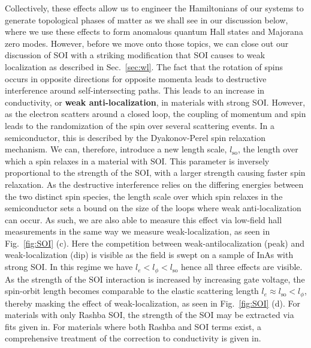 Collectively, these effects allow us to engineer the Hamiltonians of our systems to generate topological phases of matter as we shall see in our discussion below,
where we use these effects to form anomalous quantum Hall states and Majorana zero modes. However, before we move onto those topics, we can close out our discussion of SOI
with a striking modification that SOI causes to weak localization as described in Sec.~\ref{sec:wl}. The fact that the rotation of spins occurs in opposite
directions for opposite momenta leads to destructive interference around self-intersecting paths. This leads to an increase in conductivity, or \textbf{weak anti-localization},
in materials with strong SOI\cite{10.1143/PTP.63.707}. However, as the electron scatters around a closed loop, the coupling of momentum and spin leads to the randomization of
the spin over several scattering events. In a semiconductor, this is described by the Dyakonov-Perel spin relaxation
mechanism\cite{DYAKONOV1971459}. We can, therefore, introduce a new length scale, $l_\textrm{so}$, the length over which a spin relaxes in a material with SOI.
This parameter is inversely proportional to the strength of the SOI, with a larger strength causing faster spin relaxation.
As the destructive interference relies on the differing energies between the two distinct spin species, the length scale over which spin relaxes in the semiconductor sets
a bound on the size of the loops where weak anti-localization can occur. As such, we are also able to measure
this effect via low-field hall measurements in the same way we measure weak-localization, as seen in Fig.~\ref{fig:SOI} (c). Here the competition between
weak-antilocalization (peak) and weak-localization (dip) is visible as the field is swept on a sample of InAs with strong SOI. In this regime we have $l_e < l_\phi < l_\textrm{so}$
hence all three effects are visible. As the strength of the SOI interaction is increased by increasing gate voltage, the spin-orbit length becomes comparable to the elastic
scattering length $l_e \approx l_\textrm{so} < l_\phi$, thereby masking the effect of weak-localization, as seen in Fig.~\ref{fig:SOI} (d). For materials with only
Rashba SOI, the strength of the SOI may be extracted via fits given in\cite{10.1143/PTP.63.707}. For materials where both Rashba and SOI terms exist, a comprehensive
treatment of the correction to conductivity is given in\cite{PhysRevB.53.3912}.

